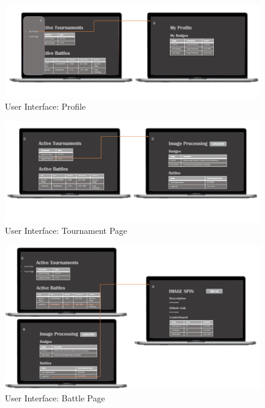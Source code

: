 \begin{figure}[Htbp!]
    \centering
    \includegraphics[width=\textwidth]{Graphics/MY PROFILE.png}
    \caption{User Interface: Profile}
    \label{fig:profile}
\end{figure}

\begin{figure}[Htbp!]
    \centering
    \includegraphics[width=\textwidth]{Graphics/TOURNAMENTS.png}
    \caption{User Interface: Tournament Page}
    \label{fig:tournaments}
\end{figure}


\begin{figure}[Htbp!]
    \centering
    \includegraphics[width=\textwidth]{Graphics/BATTLE.png}
    \caption{User Interface: Battle Page}
    \label{fig:battle}
\end{figure}



